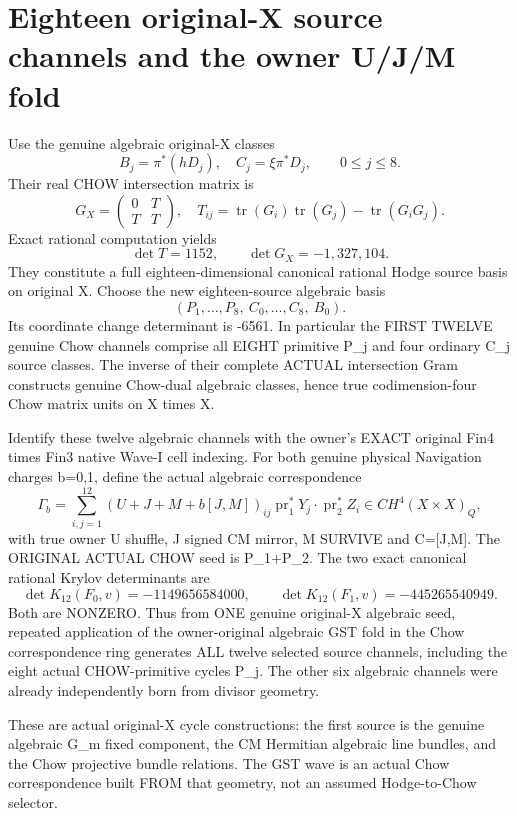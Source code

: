 \documentclass[11pt]{article}
\begin{document}
\section{Eighteen original-X source channels and the owner U/J/M fold}
Use the genuine algebraic original-X classes
\[
B_j=\pi^*(hD_j),\quad C_j=\xi\pi^*D_j,
\qquad 0\le j\le8.
\]
Their real CHOW intersection matrix is
\[
G_X=\begin{pmatrix}0&T\\T&T\end{pmatrix},
\quad T_{ij}=\operatorname{tr}(G_i)\operatorname{tr}(G_j)
-\operatorname{tr}(G_iG_j).
\]
Exact rational computation yields
\[
\boxed{\det T=1152,\qquad
\det G_X=-1{,}327{,}104.}
\tag{11}
\]
They constitute a full eighteen-dimensional
canonical rational Hodge source basis on original X.
Choose the new eighteen-source algebraic basis
\[
(P_1,\ldots,P_8,\ C_0,\ldots,C_8,\ B_0).
\]
Its coordinate change determinant is -6561.
In particular the FIRST TWELVE genuine Chow
channels comprise all EIGHT primitive P_j
and four ordinary C_j source classes.
The inverse of their complete ACTUAL
intersection Gram constructs genuine
Chow-dual algebraic classes, hence true
codimension-four Chow matrix units on X times X.

Identify these twelve algebraic channels with the
owner's EXACT original Fin4 times Fin3
native Wave-I cell indexing. For both genuine
physical Navigation charges b=0,1, define the
actual algebraic correspondence
\[
\boxed{
\Gamma_b=\sum_{i,j=1}^{12}
(U+J+M+b[J,M])_{ij}
\operatorname{pr}_1^*Y_j\cdot
\operatorname{pr}_2^*Z_i
\in CH^4(X\times X)_Q,}
\tag{12}
\]
with true owner U shuffle, J signed CM mirror,
M SURVIVE and C=[J,M].
The ORIGINAL ACTUAL CHOW seed is P_1+P_2.
The two exact canonical rational Krylov determinants are
\[
\det K_{12}(F_0,v)=-1149656584000,\qquad
\det K_{12}(F_1,v)=-445265540949.
\]
Both are NONZERO. Thus from ONE genuine original-X
algebraic seed, repeated application of the
owner-original algebraic GST fold in the
Chow correspondence ring generates ALL twelve
selected source channels, including the eight
actual CHOW-primitive cycles P_j.
The other six algebraic channels were already
independently born from divisor geometry.

These are actual original-X cycle constructions:
the first source is the genuine algebraic
G_m fixed component, the CM Hermitian
algebraic line bundles, and the Chow
projective bundle relations. The GST
wave is an actual Chow correspondence
built FROM that geometry, not an
assumed Hodge-to-Chow selector.
\end{document}
